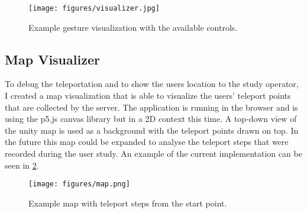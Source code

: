 \begin{figure}[!ht]
    \centering
    \texttt{[image: figures/visualizer.jpg]}
    \caption{Example gesture visualization with the available controls.}
    \label{fig:vis}
\end{figure}


\subsection{Map Visualizer}
To debug the teleportation and to show the users location to the study operator, I created a map visualization that is able to visualize the users' teleport points that are collected by the server. The application is running in the browser and is using the p5.js canvas library but in a 2D context this time. A top-down view of the unity map is used as a background with the teleport points drawn on top. In the future this map could be expanded to analyse the teleport steps that were recorded during the user study. An example of the current implementation can be seen in \ref{fig:map}.

\begin{figure}[!ht]
    \centering
    \texttt{[image: figures/map.png]}
    \caption{Example map with teleport steps from the start point.}
    \label{fig:map}
\end{figure}
